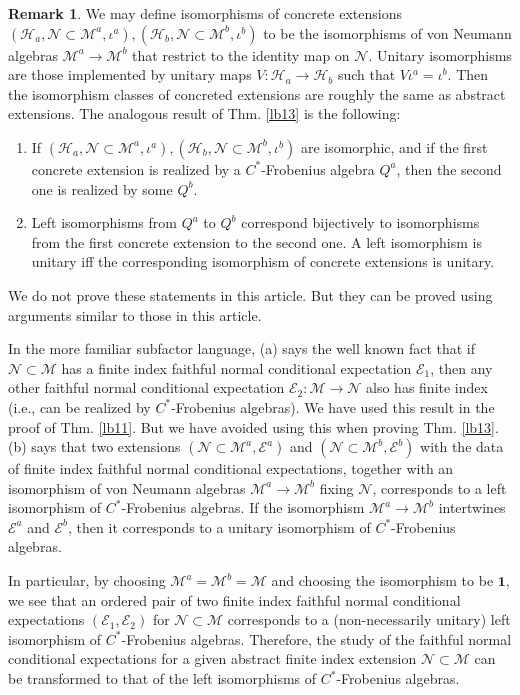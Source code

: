 \documentclass[12pt,a4paper,notitlepage]{article}
\theoremstyle{definition}
\newtheorem{rem}[df]{Remark}
\theoremstyle{plain}
\newcommand{\mc}{\mathcal}
\newcommand{\id}{\mathbf{1}}
\numberwithin{equation}{section}
\begin{document}
\begin{rem}
We may define isomorphisms of concrete extensions $(\mc H_a,\mc N\subset\mc M^a,\iota^a),(\mc H_b,\mc N\subset\mc M^b,\iota^b)$ to be the isomorphisms of von Neumann algebras $\mc M^a\rightarrow\mc M^b$ that restrict to the identity map on $\mc N$. Unitary isomorphisms are those implemented by unitary maps $V:\mc H_a\rightarrow\mc H_b$ such that $V\iota^a=\iota^b$. Then the isomorphism classes of concreted extensions are roughly the same as abstract extensions. The analogous result of Thm. \ref{lb13} is the following:
\begin{enumerate}[label=(\alph*)]
	\item If $(\mc H_a,\mc N\subset\mc M^a,\iota^a),(\mc H_b,\mc N\subset\mc M^b,\iota^b)$ are isomorphic, and if the first concrete extension is realized by a $C^*$-Frobenius algebra $Q^a$, then the second one is realized by some $Q^b$.
	\item Left isomorphisms from $Q^a$ to $Q^b$ correspond bijectively to isomorphisms from the first concrete extension to the second one. A left isomorphism is unitary iff the corresponding isomorphism of concrete extensions is unitary.
\end{enumerate}
We do not prove these statements in this article. But they can be proved using  arguments similar to  those in this article.

In the more familiar subfactor language, (a) says the well known fact that if $\mc N\subset\mc M$  has a finite index faithful normal conditional expectation $\mc E_1$, then any other faithful normal  conditional expectation $\mc E_2:\mc M\rightarrow\mc N$ also has finite index (i.e., can be realized by $C^*$-Frobenius algebras). We have used this result in the proof of Thm. \ref{lb11}. But we have avoided using this when proving Thm. \ref{lb13}. (b) says that two extensions $(\mc N\subset\mc M^a,\mc E^a)$ and $(\mc N\subset\mc M^b,\mc E^b)$ with the data of finite index faithful normal conditional expectations, together with an isomorphism of von Neumann algebras $\mc M^a\rightarrow\mc M^b$ fixing $\mc N$, corresponds  to a left isomorphism of $C^*$-Frobenius algebras. If the isomorphism $\mc M^a\rightarrow\mc M^b$ intertwines $\mc E^a$ and $\mc E^b$, then it corresponds to a unitary  isomorphism of $C^*$-Frobenius algebras.

In particular, by choosing $\mc M^a=\mc M^b=\mc M$ and choosing the isomorphism to be $\id$, we see that  an ordered pair of two finite index faithful normal conditional expectations $(\mc E_1,\mc E_2)$ for $\mc N\subset\mc M$ corresponds to a (non-necessarily unitary) left isomorphism of $C^*$-Frobenius algebras. Therefore, the study of the faithful normal conditional expectations for a given abstract finite index extension $\mc N\subset\mc M$ can be transformed  to that of  the left isomorphisms of $C^*$-Frobenius algebras. 


\end{rem}
\end{document}
